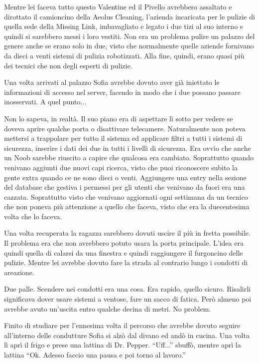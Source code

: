     Mentre lei faceva tutto questo Valentine ed il Pivello avrebbero assaltato e dirottato il camioncino della Aeolus
    Cleaning, l'azienda incaricata per le pulizie di quella sede della Missing Link, imbavagliato e legato i due tizi
    al suo interno e quindi si sarebbero messi i loro vestiti. Non era un problema pulire un palazzo del genere anche se
    erano solo in due, visto che normalmente quelle aziende fornivano da dieci a venti sistemi di pulizia robotizzati.
    Alla fine, quindi, erano quasi più dei tecnici che non degli esperti di pulizie.

    Una volta arrivati al palazzo Sofia avrebbe dovuto aver già iniettato le informazioni di accesso nel server, facendo
    in modo che i due possano passare inosservati. A quel punto...

    Non lo sapeva, in realtà. Il suo piano era di aspettare lì sotto per vedere se doveva aprire qualche porta o
    disattivare telecamere. Naturalmente non poteva mettersi a trappolare per tutto il sistema ed applicare filtri a
    tutti i sistemi di sicurezza, inserire i dati dei due in tutti i livelli di sicurezza. Era ovvio che anche un Noob
    sarebbe riuscito a capire che qualcosa era cambiato. Soprattutto quando venivano aggiunti due nuovi capi ricerca,
    visto che puoi riconoscere subito la gente extra quando ce ne sono dieci o venti. Aggiungere una entry nella sezione
    del database che gestiva i permessi per gli utenti che venivano da fuori era una cazzata. Soprattutto visto che
    venivano aggiornati ogni settimana da un tecnico che non poneva più attenzione a quello che faceva, visto che era la
    duecentesima volta che lo faceva.

    Una volta recuperata la ragazza sarebbero dovuti uscire il più in fretta possibile. Il problema era che non
    avrebbero potuto usara la porta principale. L'idea era quindi quella di calarsi da una finestra e quindi raggiungere
    il furgoncino delle pulizie. Mentre lei avrebbe dovuto fare la strada al contrario lungo i condotti di areazione.

    Due palle. Scendere nei condotti era una cosa. Era rapido, quello sicuro. Risalirli significava dover usare sistemi
    a ventose, fare un sacco di fatica. Però almeno poi avrebbe avuto un'uscita entro qualche decina di metri. No
    problem.

    Finito di studiare per l'ennesima volta il percorso che avrebbe dovuto seguire all'interno delle condutture Sofia si
    alzò dal divano ed andò in cucina. Una volta lì aprì il frigo e prese una lattina di Dr. Pepper. ``Uff...'' sbuffò,
    mentre aprì la lattina ``Ok. Adesso faccio una pausa e poi torno al lavoro.''

